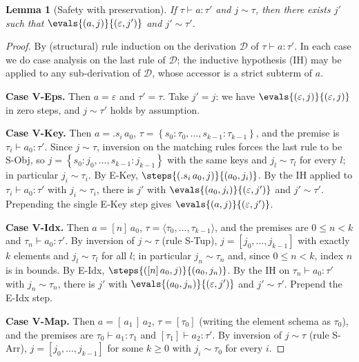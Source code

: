 \documentclass[11pt]{article}
\newcommand{\jarr}[1]{\left[#1\right]}   %
\newcommand{\jobj}[1]{\left\{#1\right\}} %
\newcommand{\matches}[2]{{#1}\sim{#2}}   %
\newcommand{\aeps}{\varepsilon}          %
\newcommand{\akey}[2]{.{#1}\,{#2}}       %
\newcommand{\aidx}[2]{[#1]\,{#2}}        %
\newcommand{\amap}[2]{[\,{#1}\,]\,{#2}}          %
\newcommand{\tup}[1]{\langle {#1} \rangle}        %
\newcommand{\valid}[3]{{#1} \vdash {#2} : {#3}}   %
\newtheorem{lemma}{Lemma}
\begin{document}
\begin{lemma}[Safety with preservation]
\label{lem:safe}
If $\valid{\tau}{a}{\tau'}$ and $\matches{j}{\tau}$, then there exists $j'$ such
that $\evals{(a, j)}{(\aeps, j')}$ and $\matches{j'}{\tau'}$.
\end{lemma}

\begin{proof}
By (structural) rule induction on the derivation $\mathcal{D}$ of
$\valid{\tau}{a}{\tau'}$. In each case we do case analysis on the last rule of
$\mathcal{D}$; the inductive hypothesis (IH) may be applied to any
sub-derivation of $\mathcal{D}$, whose accessor is a strict subterm of $a$.

\textbf{Case V-Eps.} Then $a = \aeps$ and $\tau' = \tau$. Take $j' = j$: we have
$\evals{(\aeps, j)}{(\aeps, j)}$ in zero steps, and $\matches{j}{\tau'}$ holds by
assumption.

\textbf{Case V-Key.} Then $a = \akey{s_i}{a_0}$,
$\tau = \jobj{s_0 : \tau_0, \ldots, s_{k-1}:\tau_{k-1}}$, and the premise is
$\valid{\tau_i}{a_0}{\tau'}$. Since $\matches{j}{\tau}$, inversion on the
matching rules forces the last rule to be S-Obj, so
$j = \jobj{s_0 : j_0, \ldots, s_{k-1} : j_{k-1}}$ with the same keys and
$\matches{j_l}{\tau_l}$ for every $l$; in particular $\matches{j_i}{\tau_i}$.
By E-Key, $\steps{(\akey{s_i}{a_0}, j)}{(a_0, j_i)}$. By the IH applied to
$\valid{\tau_i}{a_0}{\tau'}$ with $\matches{j_i}{\tau_i}$, there is $j'$ with
$\evals{(a_0, j_i)}{(\aeps, j')}$ and $\matches{j'}{\tau'}$. Prepending the
single E-Key step gives $\evals{(a, j)}{(\aeps, j')}$.

\textbf{Case V-Idx.} Then $a = \aidx{n}{a_0}$,
$\tau = \tup{\tau_0, \ldots, \tau_{k-1}}$, and the premises are $0 \le n < k$ and
$\valid{\tau_n}{a_0}{\tau'}$. By inversion of $\matches{j}{\tau}$ (rule S-Tup),
$j = \jarr{j_0, \ldots, j_{k-1}}$ with exactly $k$ elements and
$\matches{j_l}{\tau_l}$ for all $l$; in particular $\matches{j_n}{\tau_n}$ and,
since $0 \le n < k$, index $n$ is in bounds. By E-Idx,
$\steps{(\aidx{n}{a_0}, j)}{(a_0, j_n)}$. By the IH on
$\valid{\tau_n}{a_0}{\tau'}$ with $\matches{j_n}{\tau_n}$, there is $j'$ with
$\evals{(a_0, j_n)}{(\aeps, j')}$ and $\matches{j'}{\tau'}$. Prepend the E-Idx
step.

\textbf{Case V-Map.} Then $a = \amap{a_1}{a_2}$, $\tau = \jarr{\tau_0}$ (writing
the element schema as $\tau_0$), and the premises are
$\valid{\tau_0}{a_1}{\tau_1}$ and $\valid{\jarr{\tau_1}}{a_2}{\tau'}$. By
inversion of $\matches{j}{\tau}$ (rule S-Arr), $j = \jarr{j_0, \ldots, j_{k-1}}$
for some $k \ge 0$ with $\matches{j_i}{\tau_0}$ for every $i$.


\end{proof}
\end{document}
